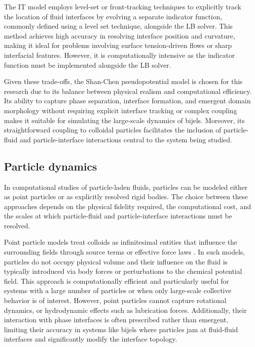 The IT model employs level-set or front-tracking techniques to explicitly track the location of fluid interfaces by evolving a separate indicator 
function, commonly defined using a level set technique, alongside the LB solver. \cite{haghani_hassan_abadi_conservative_2018, liang_lattice_2023}
This method achieves high accuracy in resolving interface position and curvature, making it ideal for problems 
involving surface tension-driven flows or sharp interfacial features. However, it is computationally intensive as the indicator function must be implemented alongside
the LB solver. 

Given these trade-offs, the Shan-Chen pseudopotential model is chosen for this research due to its balance between physical realism and computational 
efficiency. \cite{jansen_bijels_2011,gunther_timescales_2014, gunther_lattice_2013, xie_direct_2017}
Its ability to capture phase separation, interface formation, and emergent domain morphology without requiring explicit interface 
tracking or complex coupling makes it suitable for simulating the large-scale dynamics of bijels. Moreover, its straightforward coupling to 
colloidal particles facilitates the inclusion of particle-fluid and particle-interface interactions central to the system being studied.

\subsection{Particle dynamics}

In computational studies of particle-laden fluids, particles can be modeled either as point particles or as explicitly resolved rigid bodies. The choice between 
these approaches depends on the physical fidelity required, the computational cost, and the scales at which particle-fluid and particle-interface interactions must be resolved.

Point particle models treat colloids as infinitesimal entities that influence the surrounding fields through source terms or effective force laws
\cite{mehrabadi_direct_2018, prosperetti_point-particle_2007, frohlich_validation_2018}.
In such models, particles do not occupy physical volume and their influence on the fluid is typically introduced via body forces or perturbations to the chemical potential field. 
This approach is computationally efficient and particularly useful for systems with a large number of particles or when only large-scale collective behavior is of interest. 
However, point particles cannot capture rotational dynamics, or hydrodynamic effects such as lubrication forces. Additionally, 
their interaction with phase interfaces is often prescribed rather than emergent, limiting their accuracy in systems like bijels where particles jam at fluid-fluid interfaces 
and significantly modify the interface topology.

